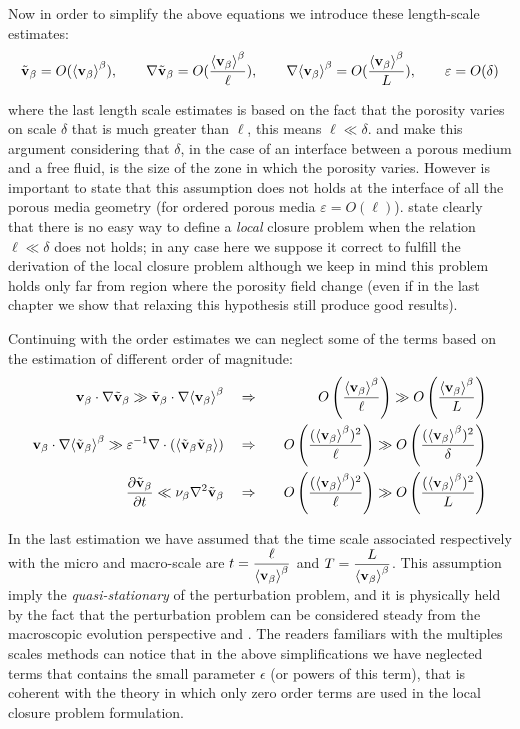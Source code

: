 Now in order to simplify the above equations we introduce these length-scale estimates:
$$ \tilde{\textbf{v}}_{\beta} = O({\left< \textbf{v}_{\beta} \right>}^{\beta}), \qquad \nabla\tilde{\textbf{v}}_{\beta} = O(\dfrac{{\left< \textbf{v}_{\beta} \right>}^{\beta}}{\ell}), \qquad  \nabla {\left< \textbf{v}_{\beta}\right>}^{\beta} = O(\dfrac{{\left< \textbf{v}_{\beta} \right>}^{\beta}}{L}), \qquad \varepsilon = O(\delta) $$

where the last length scale estimates is based on the fact that the porosity varies on scale $\delta$ that is much greater than $\ell$, this means $\ell \ll \delta$. \citet{valdes2013velocity} and \citet{ochoa1995momentum} make this argument considering that $\delta$, in the case of an interface between a porous medium and a free fluid, is the size of the zone in which the porosity varies.
However is important to state that this assumption does not holds at the interface of all the porous media geometry (for ordered porous media $\varepsilon = O(\ell)$).
\citet{whitaker1996forchheimer} state clearly that there is no easy way to define a \textit{local} closure problem when the relation $\ell \ll \delta$ does not holds; in any case here we suppose it correct to fulfill the derivation of the local closure problem although we keep in mind this problem holds only far from region where the porosity field change (even if in the last chapter we show that relaxing this hypothesis still produce good results).

Continuing with the order estimates we can neglect some of the terms based on the estimation of different order of magnitude:
\begin{eqnarray}
\textbf{v}_{\beta} \cdot \nabla \tilde{\textbf{v}}_{\beta} \gg \tilde{\textbf{v}}_{\beta} \cdot \nabla {\left< \textbf{v}_{\beta}\right>}^{\beta} \quad &\Rightarrow&  \quad O\left(\dfrac{{\left< \textbf{v}_{\beta} \right>}^{\beta}}{\ell}\right) \gg O\left(\dfrac{{\left< \textbf{v}_{\beta} \right>}^{\beta}}{L} \right) \\
\textbf{v}_{\beta} \cdot \nabla {\left< \tilde{\textbf{v}}_{\beta}\right>}^{\beta} \gg  \varepsilon^{-1} \nabla \cdot \left({\left< \tilde{\textbf{v}}_{\beta} \tilde{\textbf{v}}_{\beta} \right>}\right)  \quad &\Rightarrow& \quad O\left(\dfrac{({\left< \textbf{v}_{\beta} \right>}^{\beta})^2}{\ell}\right) \gg O\left(\dfrac{({\left< \textbf{v}_{\beta} \right>}^{\beta})^2}{\delta} \right) \\
\dfrac{\partial \tilde{\textbf{v}}_{\beta}}{\partial t} \ll \nu_{\beta} \nabla^2 \tilde{\textbf{v}}_{\beta}  \quad &\Rightarrow&  \quad O\left(\dfrac{({\left< \textbf{v}_{\beta} \right>}^{\beta})^2}{\ell}\right) \gg O\left(\dfrac{({\left< \textbf{v}_{\beta} \right>}^{\beta})^2}{L} \right) 
\end{eqnarray}

In the last estimation we have assumed that the time scale associated respectively with the micro and macro-scale are $t = \dfrac{\ell}{{\left< \textbf{v}_{\beta} \right>}^{\beta}}$ and $T =\dfrac{L}{{\left< \textbf{v}_{\beta} \right>}^{\beta}}$.
This assumption imply the \textit{quasi-stationary} of the perturbation problem, and it is physically held by the fact that the perturbation problem can be considered steady from the macroscopic evolution perspective \citet{davit2013homogenization} and \citet{zhu2014study}.
The readers familiars with the multiples scales methods can notice that in the above simplifications we have neglected terms that contains the small parameter $\epsilon$ (or powers of this term), that is coherent with the theory in which only zero order terms are used in the local closure problem formulation.

